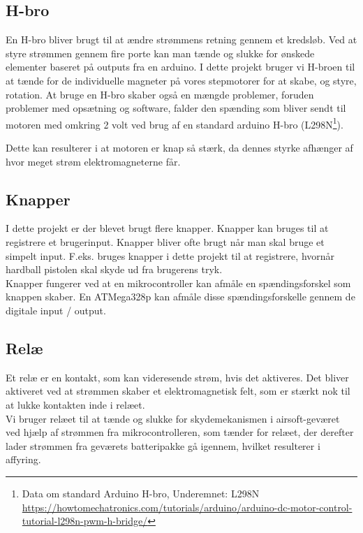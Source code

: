 \subsection{H-bro}
En H-bro bliver brugt til at ændre strømmens retning gennem et kredsløb. Ved at styre strømmen gennem fire porte kan man tænde og slukke for ønskede elementer baseret på outputs fra en arduino. I dette projekt bruger vi H-broen til at tænde for de individuelle magneter på vores stepmotorer for at skabe, og styre, rotation. At bruge en H-bro skaber også en mængde problemer, foruden problemer med opsætning og software, falder den spænding som bliver sendt til motoren med omkring 2 volt ved brug af en standard arduino H-bro (L298N\footnote{Data om standard Arduino H-bro, Underemnet: L298N \url{https://howtomechatronics.com/tutorials/arduino/arduino-dc-motor-control-tutorial-l298n-pwm-h-bridge/}}). 

Dette kan resulterer i at motoren er knap så stærk, da dennes styrke afhænger af hvor meget strøm elektromagneterne får. 


\subsection{Knapper}
I dette projekt er der blevet brugt flere knapper. Knapper kan bruges til at registrere et brugerinput. Knapper bliver ofte brugt når man skal bruge et simpelt input. F.eks. bruges knapper i dette projekt til at registrere, hvornår hardball pistolen skal skyde ud fra brugerens tryk.\\

Knapper fungerer ved at en mikrocontroller kan afmåle en spændingsforskel som knappen skaber. En ATMega328p kan afmåle disse spændingsforskelle gennem de digitale input / output. 

\subsection{Relæ}
Et relæ er en kontakt, som kan videresende strøm, hvis det aktiveres. Det bliver aktiveret ved at strømmen skaber et elektromagnetisk felt, som er stærkt nok til at lukke kontakten inde i relæet.\\

Vi bruger relæet til at tænde og slukke for skydemekanismen i airsoft-geværet ved hjælp af strømmen fra mikrocontrolleren, som tænder for relæet, der derefter lader strømmen fra geværets batteripakke gå igennem, hvilket resulterer i affyring.



